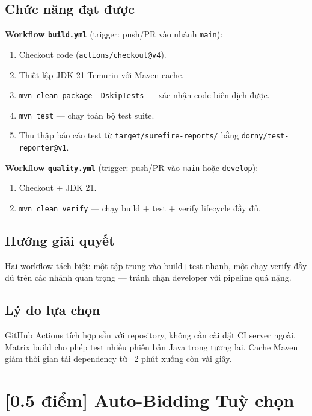 \documentclass[12pt,a4paper]{article}
\newcommand{\score}[1]{\textbf{[#1 điểm]}}
\newcommand{\optional}{\textcolor{optionalcolor}{\textbf{Tuỳ chọn}}}
\begin{document}
\subsection*{Chức năng đạt được}

\textbf{Workflow \texttt{build.yml}} (trigger: push/PR vào nhánh \texttt{main}):
\begin{enumerate}[leftmargin=2em]
  \item Checkout code (\texttt{actions/checkout@v4}).
  \item Thiết lập JDK 21 Temurin với Maven cache.
  \item \texttt{mvn clean package -DskipTests} — xác nhận code biên dịch được.
  \item \texttt{mvn test} — chạy toàn bộ test suite.
  \item Thu thập báo cáo test từ \texttt{target/surefire-reports/} bằng \texttt{dorny/test-reporter@v1}.
\end{enumerate}

\textbf{Workflow \texttt{quality.yml}} (trigger: push/PR vào \texttt{main} hoặc \texttt{develop}):
\begin{enumerate}[leftmargin=2em]
  \item Checkout + JDK 21.
  \item \texttt{mvn clean verify} — chạy build + test + verify lifecycle đầy đủ.
\end{enumerate}

\subsection*{Hướng giải quyết}
Hai workflow tách biệt: một tập trung vào build+test nhanh, một chạy verify đầy đủ trên các nhánh quan trọng — tránh chặn developer với pipeline quá nặng.

\subsection*{Lý do lựa chọn}
GitHub Actions tích hợp sẵn với repository, không cần cài đặt CI server ngoài. Matrix build cho phép test nhiều phiên bản Java trong tương lai. Cache Maven giảm thời gian tải dependency từ ~2 phút xuống còn vài giây.


\section{\score{0.5} Auto-Bidding \hfill \optional}
\end{document}
